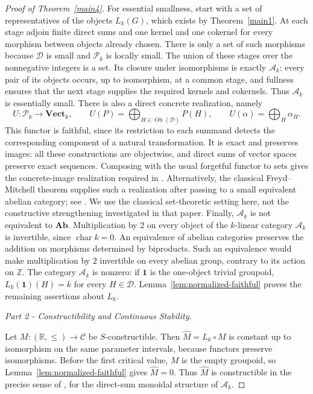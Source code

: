 \documentclass{amsart}
\begin{document}
\begin{proof}[Proof of Theorem~\ref{main4}]
For essential smallness, start with a set of representatives of the objects $L_k(G)$, which exists by Theorem~\ref{main1}. At each stage adjoin finite direct sums and one kernel and one cokernel for every morphism between objects already chosen. There is only a set of such morphisms because $\mathcal D$ is small and $\mathcal P_k$ is locally small. The union of these stages over the nonnegative integers is a set. Its closure under isomorphisms is exactly $\mathcal A_k$: every pair of its objects occurs, up to isomorphism, at a common stage, and fullness ensures that the next stage supplies the required kernels and cokernels. Thus $\mathcal A_k$ is essentially small. There is also a direct concrete realization, namely
\[
U:\mathcal P_k\longrightarrow\mathbf{Vect}_k,
\qquad U(P)=\bigoplus_{H\in\operatorname{Ob}(\mathcal D)}P(H),
\qquad U(\alpha)=\bigoplus_H\alpha_H.
\]
This functor is faithful, since its restriction to each summand detects the corresponding component of a natural transformation. It is exact and preserves images: all these constructions are objectwise, and direct sums of vector spaces preserve exact sequences. Composing with the usual forgetful functor to sets gives the concrete-image realization required in \cite[Section~8, p.~413]{patel2016generalized}. Alternatively, the classical Freyd--Mitchell theorem supplies such a realization after passing to a small equivalent abelian category; see \cite[Introduction and Section~2]{montaruli}. We use the classical set-theoretic setting here, not the constructive strengthening investigated in that paper.
Finally, $\mathcal A_k$ is not equivalent to $\mathbf{Ab}$. Multiplication by $2$ on every object of the $k$-linear category $\mathcal A_k$ is invertible, since $\operatorname{char}k=0$. An equivalence of abelian categories preserves the addition on morphisms determined by biproducts. Such an equivalence would make multiplication by $2$ invertible on every abelian group, contrary to its action on $\mathbb Z$. The category $\mathcal A_k$ is nonzero: if $\mathbf1$ is the one-object trivial groupoid, $L_k(\mathbf1)(H)=k$ for every $H\in\mathcal D$. Lemma~\ref{lem:normalized-faithful} proves the remaining assertions about $L_k$.

\medskip

\textit{Part 2 - Constructibility and Continuous Stability}. 

\medskip

Let $M:(\mathbb R,\leq)\to\mathcal C$ be $S$-constructible. Then $\widehat M=L_k\circ M$ is constant up to isomorphism on the same parameter intervals, because functors preserve isomorphisms. Before the first critical value, $M$ is the empty groupoid, so Lemma~\ref{lem:normalized-faithful} gives $\widehat M=0$. Thus $\widehat M$ is constructible in the precise sense of \cite[Definition~2.2]{patel2016generalized}, for the direct-sum monoidal structure of $\mathcal A_k$.


\end{proof}
\end{document}

